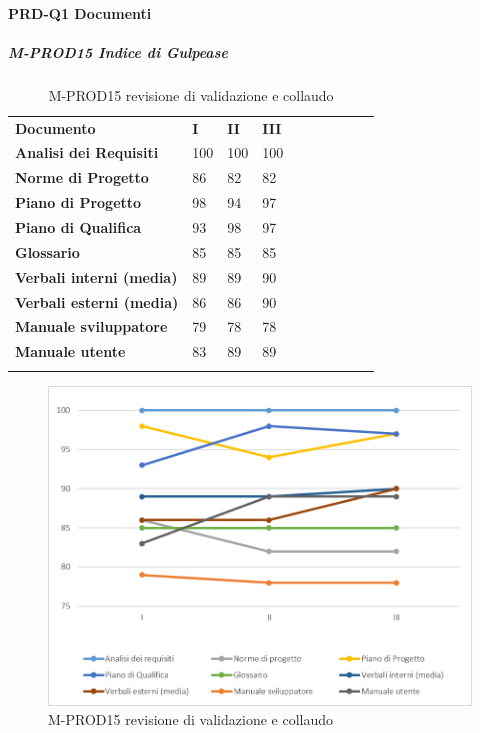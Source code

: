 \paragraph*{PRD-Q1 Documenti}
\subparagraph{M-PROD15 Indice di Gulpease}\mbox{}
\begin{longtable} {						
		>{}p{50mm}  		
		>{}p{8mm}		
		>{}p{8mm}		
		>{}p{8mm}		
		>{}p{8mm}		
		>{}p{8mm}		
		>{}p{8mm}
		>{}p{8mm}
		>{}p{8mm}
		>{}p{8mm}				
	}			
	\rowcolor{gray!50}
	\textbf{Documento} & \textbf{I} & \textbf{II} & \textbf{III} \TBstrut \\ [2mm]
	\textbf{Analisi dei Requisiti} & 100 & 100 & 100  \TBstrut \\ [2mm]
	\textbf{Norme di Progetto} & 86 & 82 & 82 \TBstrut \\ [2mm]
	\textbf{Piano di Progetto} & 98 & 94 & 97 \TBstrut \\ [2mm]
	\textbf{Piano di Qualifica} & 93 & 98 & 97 \TBstrut \\ [2mm]
	\textbf{Glossario} & 85 & 85 & 85 \TBstrut \\ [2mm]
	\textbf{Verbali interni (media)} & 89 & 89 & 90 \TBstrut \\ [2mm]
	\textbf{Verbali esterni (media)} & 86 & 86 & 90 \TBstrut \\ [2mm]
	\textbf{Manuale sviluppatore} & 79 & 78 & 78 \TBstrut \\ [2mm]
	\textbf{Manuale utente} & 83 & 89 & 89 \TBstrut \\ [2mm]
	\rowcolor{white}
	\caption{M-PROD15 revisione di validazione e collaudo}
\end{longtable}
\begin{figure}[H] 	
	\includegraphics[width=\linewidth]{./img/grafici/RA15a.png}	
	\caption{M-PROD15 revisione di validazione e collaudo}	
\end{figure}

